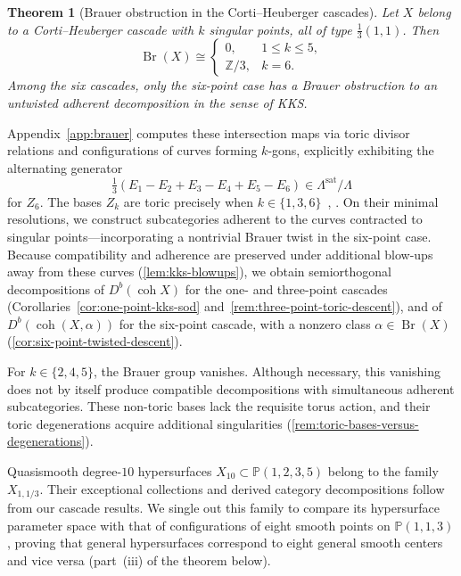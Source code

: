 \documentclass[11pt]{article}
\theoremstyle{plain}
\newtheorem{theorem}{Theorem}[section]
\theoremstyle{definition}
\theoremstyle{remark}
\begin{document}
\begin{theorem}[Brauer obstruction in the Corti--Heuberger cascades]
\label{thm:brauer-cascades-intro}
Let $X$ belong to a Corti--Heuberger cascade with $k$ singular points, all of
type $\tfrac13(1,1)$. Then
\[
\operatorname{Br}(X)\cong
\begin{cases}
0, & 1\le k\le 5,\\
\mathbb Z/3, & k=6.
\end{cases}
\]
Among the six cascades, only the six-point case has a Brauer obstruction
to an untwisted adherent decomposition in the sense of KKS.
\end{theorem}

Appendix~\ref{app:brauer} computes these intersection maps via toric divisor relations and configurations of curves forming $k$-gons, explicitly exhibiting the alternating generator
\[
\tfrac13(E_1-E_2+E_3-E_4+E_5-E_6) \in \Lambda^{\mathrm{sat}}/\Lambda
\]
for $Z_6$. The bases $Z_k$ are toric precisely when $k\in\{1,3,6\}$~\cite[Tables~1, 2 and~4]{Corti2016}, \cite[Table~1]{OnetoPetracci2018}. On their minimal resolutions, we construct subcategories adherent to the curves contracted to singular points—incorporating a nontrivial Brauer twist in the six-point case. Because compatibility and adherence are preserved under additional blow-ups away from these curves (\cref{lem:kks-blowups}), we obtain semiorthogonal decompositions of $D^b(\operatorname{coh}X)$ for the one- and three-point cascades (Corollaries~\ref{cor:one-point-kks-sod} and~\ref{rem:three-point-toric-descent}), and of $D^b(\operatorname{coh}(X,\alpha))$ for the six-point cascade, with a nonzero class $\alpha\in\operatorname{Br}(X)$ (\cref{cor:six-point-twisted-descent}).

For $k\in\{2,4,5\}$, the Brauer group vanishes. Although necessary, this vanishing does not by itself produce compatible decompositions with simultaneous adherent subcategories. These non-toric bases lack the requisite torus action, and their toric degenerations acquire additional singularities (\cref{rem:toric-bases-versus-degenerations}).

Quasismooth degree-$10$ hypersurfaces $X_{10}\subset\mathbb P(1,2,3,5)$ belong to the family $X_{1,1/3}$. Their exceptional collections and derived category decompositions follow from our cascade results. We single out this family to compare its hypersurface parameter space with that of configurations of eight smooth points on $\mathbb P(1,1,3)$, proving that general hypersurfaces correspond to eight general smooth centers and vice versa (part~(iii) of the theorem below).
\end{document}
